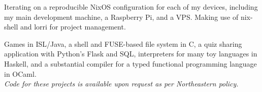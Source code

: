 \documentclass[letterpaper]{resume} %
\begin{document}
\begin{minipage}[t]{0.66\textwidth}
Iterating on a reproducible NixOS configuration for each of my devices,
including my main development machine, a Raspberry Pi, and a VPS.\@
Making use of nix-shell and lorri for project management.
\sectionspace

Games in ISL/Java,
a shell and FUSE-based file system in C,
a quiz sharing application with Python's Flask and SQL,
interpreters for many toy languages in Haskell,
and a substantial compiler for a typed functional programming language in OCaml. \\
\textit{Code for these projects is available upon request as per Northeastern policy.}

\end{minipage} %
\end{document}
